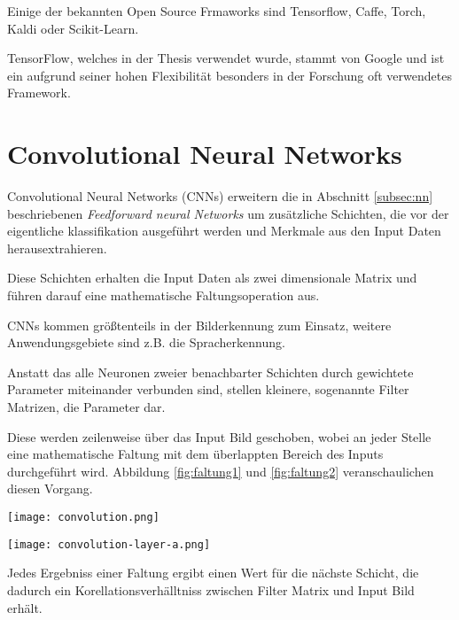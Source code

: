 Einige der bekannten Open Source Frmaworks sind Tensorflow,
Caffe, Torch, Kaldi oder Scikit-Learn.

TensorFlow, welches in der Thesis verwendet wurde, stammt von 
Google und ist ein aufgrund seiner hohen Flexibilität besonders 
in der Forschung oft verwendetes Framework.



\section{Convolutional Neural Networks}\label{subsec:cnn}

Convolutional Neural Networks (CNNs) erweitern 
die in Abschnitt \ref{subsec:nn} beschriebenen
\textit{Feedforward neural Networks} um zusätzliche Schichten,
die vor der eigentliche klassifikation ausgeführt werden
und Merkmale aus den Input Daten herausextrahieren.

Diese Schichten erhalten die Input Daten als zwei 
dimensionale Matrix und führen darauf eine 
mathematische Faltungsoperation aus.

CNNs kommen größtenteils in der Bilderkennung zum 
Einsatz, weitere Anwendungsgebiete sind 
z.B. die Spracherkennung.

Anstatt das alle Neuronen zweier benachbarter Schichten 
durch gewichtete Parameter miteinander verbunden sind, 
stellen kleinere, sogenannte Filter Matrizen, die 
Parameter dar.

Diese werden zeilenweise über das Input Bild 
geschoben, wobei an jeder Stelle eine mathematische 
Faltung mit dem überlappten Bereich des Inputs 
durchgeführt wird. Abbildung \ref{fig:faltung1}
und \ref{fig:faltung2} veranschaulichen diesen Vorgang.

\vspace{1cm}
\begin{minipage}{0.5\textwidth}
    \centering
    \texttt{[image: convolution.png]}
    \label{fig:faltung1}
\end{minipage}
\begin{minipage}{0.5\textwidth}
    \centering
    \texttt{[image: convolution-layer-a.png]}
    \label{fig:faltung2}
\end{minipage}
\vspace{1cm}

Jedes Ergebniss einer Faltung ergibt einen Wert für 
die nächste Schicht, die dadurch 
ein Korellationsverhälltniss zwischen
Filter Matrix und Input Bild erhält.


